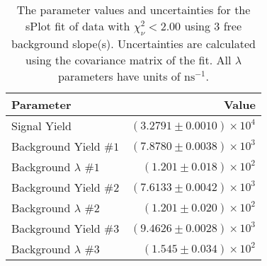 
\begin{table}
    \begin{center}
        \begin{tabular}{lr}\toprule
            Parameter & Value \\\midrule
            Signal Yield & $(3.2791 \pm 0.0010) \times 10^{4}$ \\
            Background Yield $\#1$ & $(7.8780 \pm 0.0038) \times 10^{3}$ \\
            Background $\lambda$ $\#1$ & $(1.201 \pm 0.018) \times 10^{2}$ \\
            Background Yield $\#2$ & $(7.6133 \pm 0.0042) \times 10^{3}$ \\
            Background $\lambda$ $\#2$ & $(1.201 \pm 0.020) \times 10^{2}$ \\
            Background Yield $\#3$ & $(9.4626 \pm 0.0028) \times 10^{3}$ \\
            Background $\lambda$ $\#3$ & $(1.545 \pm 0.034) \times 10^{2}$ \\\bottomrule
        \end{tabular}
        \caption{The parameter values and uncertainties for the sPlot fit of data with $\chi^2_\nu < 2.00$ using 3 free background slope(s). Uncertainties are calculated using the covariance matrix of the fit. All $\lambda$ parameters have units of $\si{\nano\second}^{-1}$.}
    \end{center}
\end{table}

